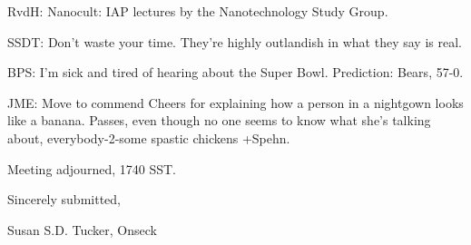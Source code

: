 \documentclass[12pt]{article}
\begin{document}
RvdH: Nanocult: IAP lectures by the Nanotechnology Study Group.

SSDT: Don't waste your time. They're highly outlandish in what they say is real.

BPS: I'm sick and tired of hearing about the Super Bowl. Prediction: Bears, 57-0.

JME: Move to commend Cheers for explaining how a person in a nightgown looks like a banana. Passes, even though no one seems to know what she's talking about, everybody-2-some spastic chickens +Spehn.

\vspace{12pt}

\noindent
Meeting adjourned, 1740 SST.

\vspace{18pt}

\centerline{Sincerely submitted,}
\centerline{Susan S.D. Tucker, Onseck}
\end{document}

